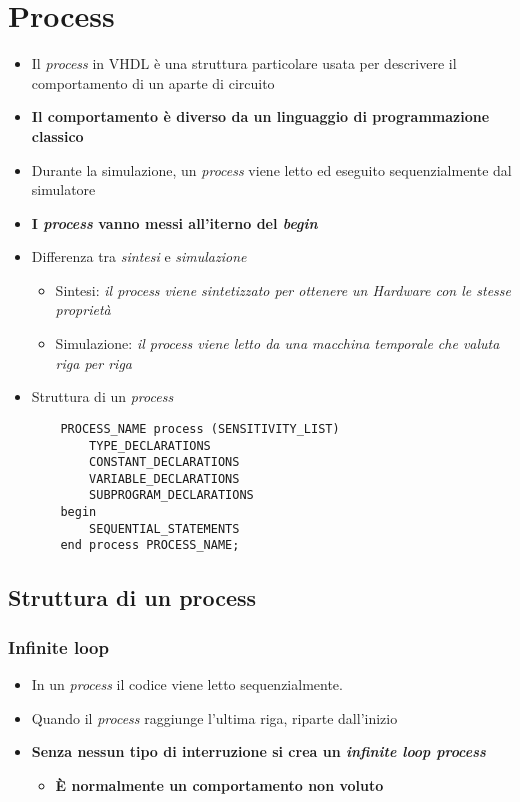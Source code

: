 \documentclass{article}
\begin{document}
\section{Process}
\begin{itemize}
	\item Il \textit{process} in VHDL è una struttura particolare usata per descrivere il comportamento di un aparte di circuito
	\item \textbf{Il comportamento è diverso da un linguaggio di programmazione classico}
	\item Durante la simulazione, un \textit{process} viene letto ed eseguito sequenzialmente dal simulatore
	\item \textbf{I \textit{process} vanno messi all'iterno del \textit{begin}}
	\item Differenza tra \textit{sintesi} e \textit{simulazione}
	      \begin{itemize}
	      	\item Sintesi: \textit{il process viene sintetizzato per ottenere un Hardware con le stesse proprietà}
	      	\item Simulazione: \textit{il process viene letto da una macchina temporale che valuta riga per riga}
	      \end{itemize}
	\item Struttura di un \textit{process}
	      \begin{verbatim}
    PROCESS_NAME process (SENSITIVITY_LIST)
        TYPE_DECLARATIONS
        CONSTANT_DECLARATIONS
        VARIABLE_DECLARATIONS
        SUBPROGRAM_DECLARATIONS
    begin
        SEQUENTIAL_STATEMENTS
    end process PROCESS_NAME;
	      \end{verbatim}
\end{itemize}
\subsection{Struttura di un process}
\subsubsection{Infinite loop}
\begin{itemize}
	\item In un \textit{process} il codice viene letto sequenzialmente.
	\item Quando il \textit{process} raggiunge l'ultima riga, riparte dall'inizio
	\item \textbf{Senza nessun tipo di interruzione si crea un \textit{infinite loop process}}
	\begin{itemize}
		\item \textbf{\`E normalmente un comportamento non voluto}
	\end{itemize}
\end{itemize}
\end{document}
